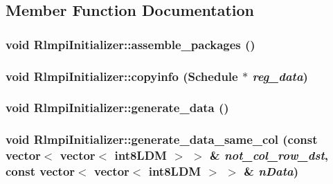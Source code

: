 \subsection{Member Function Documentation}
\hypertarget{classRlmpiInitializer_a03d8fdd916121bf1e703408abaf00492}{
\subsubsection[{assemble\_\-packages}]{\setlength{\rightskip}{0pt plus 5cm}void RlmpiInitializer::assemble\_\-packages ()}}
\label{classRlmpiInitializer_a03d8fdd916121bf1e703408abaf00492}
\hypertarget{classRlmpiInitializer_a81cbb1880215e0efec360a368bc2b3fa}{
\subsubsection[{copyinfo}]{\setlength{\rightskip}{0pt plus 5cm}void RlmpiInitializer::copyinfo ({\bf Schedule} $\ast$ {\em reg\_\-data})}}
\label{classRlmpiInitializer_a81cbb1880215e0efec360a368bc2b3fa}
\hypertarget{classRlmpiInitializer_ab93e99398a7d1ef2a21748260945d0ef}{
\subsubsection[{generate\_\-data}]{\setlength{\rightskip}{0pt plus 5cm}void RlmpiInitializer::generate\_\-data ()}}
\label{classRlmpiInitializer_ab93e99398a7d1ef2a21748260945d0ef}
\hypertarget{classRlmpiInitializer_a68f0277b57d6a61af97846cd9e100ddc}{
\subsubsection[{generate\_\-data\_\-same\_\-col}]{\setlength{\rightskip}{0pt plus 5cm}void RlmpiInitializer::generate\_\-data\_\-same\_\-col (const vector$<$ vector$<$ {\bf int8LDM} $>$ $>$ \& {\em not\_\-col\_\-row\_\-dst}, \/  const vector$<$ vector$<$ {\bf int8LDM} $>$ $>$ \& {\em nData})}}
